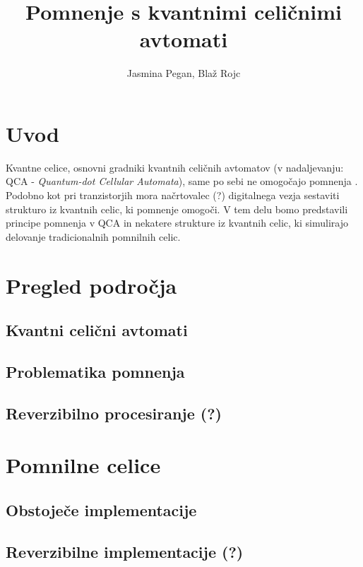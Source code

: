 \documentclass[a4paper, 11pt]{article}
\title{Pomnenje s kvantnimi celičnimi avtomati}
\author{Jasmina Pegan, Blaž Rojc}
\begin{document}
\maketitle

\section{Uvod}

Kvantne celice, osnovni gradniki kvantnih celičnih avtomatov (v nadaljevanju: QCA - \emph{Quantum-dot Cellular Automata}), same po sebi ne omogočajo pomnenja \cite{janez_phd}.
Podobno kot pri tranzistorjih mora načrtovalec (?) digitalnega vezja sestaviti strukturo iz kvantnih celic, ki pomnenje omogoči.
V tem delu bomo predstavili principe pomnenja v QCA in nekatere strukture iz kvantnih celic, ki simulirajo delovanje tradicionalnih pomnilnih celic.



\section{Pregled področja}

\subsection{Kvantni celični avtomati}

\subsection{Problematika pomnenja}

\subsection{Reverzibilno procesiranje (?)}



\section{Pomnilne celice}

\subsection{Obstoječe implementacije}

\subsection{Reverzibilne implementacije (?)}
\end{document}

